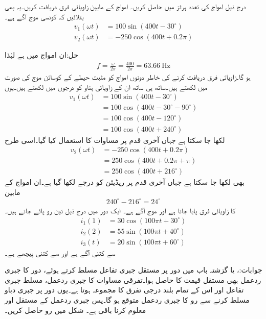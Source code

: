 درج ذیل امواج کی تعدد ہرٹز میں حاصل کریں۔ امواج کے مابین زاویائی فرق دریافت کریں۔یہ بھی بتلائیں کہ کونسی موج آگے ہے۔
\begin{align*}
v_1(\omega t)&=100\sin(400t -30^{\circ})\\
v_2(\omega t)&=-250\cos(400t+0.2\pi)
\end{align*}

حل:ان امواج میں  ہے لہٰذا
\begin{align*}
f=\frac{\omega}{2\pi}=\frac{400}{2\pi}=\SI{63.66}{\hertz}
\end{align*}
ہو گا۔زاویائی فرق دریافت کرنے کی خاطر دونوں امواج کو مثبت حیطے کے کوسائن موج کی صورت میں لکھتے ہیں۔ساتھ ہی ساتھ ان کے زاویائی ہٹاو کو درجوں میں لکھتے ہیں۔یوں
\begin{align*}
v_1(\omega t)&=100\sin(400t -30^{\circ})\\
&=100\cos(400t-30^{\circ}-90^{\circ})\\
&=100\cos(400t-120^{\circ})\\
&=100\cos(400t+240^{\circ})
\end{align*}
لکھا جا سکتا ہے جہاں آخری قدم پر مساوات  کا استعمال کیا گیا۔اسی طرح
\begin{align*}
v_2(\omega t)&=-250\cos(400t+0.2\pi)\\
&=250\cos(400t+0.2\pi+\pi)\\
&=250\cos(400t+216^{\circ})
\end{align*}
بھی لکھا جا سکتا ہے جہاں آخری قدم پر  ریڈیئن کو  درجے لکھا گیا ہے۔ان امواج کے مابین
\begin{align*}
240^{\circ}-216^{\circ}=24^{\circ}
\end{align*}
کا زاویائی فرق پایا جاتا ہے اور موج  آگے ہے۔
ایک دور میں درج ذیل تین رو پائے جاتے ہیں۔
\begin{align*}
i_1(1)&=30\cos(100\pi t+30^{\circ})\\
i_2(2)&=55\sin(100\pi t +40^{\circ})\\
i_3(t)&=20\sin(100 \pi t+60^{\circ})
\end{align*}
 سے  کتنی آگے ہے اور  سے  کتنی پیچھے ہے۔

جوابات:،  یا  
گزشتہ باب میں دور پر مستقل جبری تفاعل مسلط  کرتے ہوئے، دور کا جبری ردعمل بھی مستقل قیمت کا حاصل ہوا۔تفرقی مساوات کا جبری ردعمل، مسلط جبری تفاعل اور اس کے تمام بلند درجی تفرق کا مجموعہ ہوتا ہے۔یوں  دور پر جبری دباو  مسلط کرنے سے رو کا جبری ردعمل  متوقع ہو گا۔پس جبری ردعمل کے مستقل  اور  معلوم کرنا باقی ہے۔
شکل  میں رو  حاصل کریں۔

